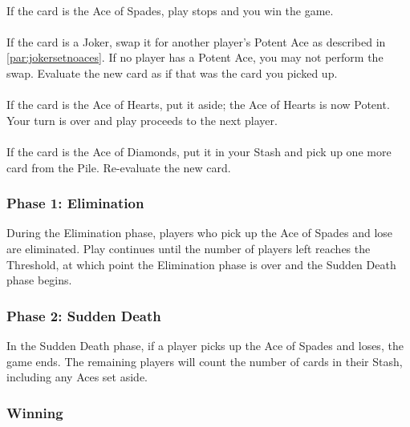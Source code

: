 \documentclass{article}
\begin{document}
\paragraph{}
If the card is the Ace of Spades, play stops and you win the game.

\paragraph{}
If the card is a Joker, swap it for another player's Potent Ace as
described in \autoref{par:jokersetnoaces}. If no player has a Potent Ace,
you may not perform the swap. Evaluate the new card as if that was the
card you picked up.

\paragraph{}
If the card is the Ace of Hearts, put it aside; the Ace of Hearts is now
Potent. Your turn is over and play proceeds to the next player.

\paragraph{}
If the card is the Ace of Diamonds, put it in your Stash and pick up one
more card from the Pile. Re-evaluate the new card.


\subsubsection{Phase 1: Elimination}
\label{sec:elimination}

During the Elimination phase, players who pick up the Ace of Spades and
lose are eliminated. Play continues until the number of players left
reaches the Threshold, at which point the Elimination phase is over and
the Sudden Death phase begins.

\subsubsection{Phase 2: Sudden Death}
\label{sec:sd}

In the Sudden Death phase, if a player picks up the Ace of Spades and
loses, the game ends. The remaining players will count the number of
cards in their Stash, including any Aces set aside.

\subsubsection{Winning}
\end{document}
